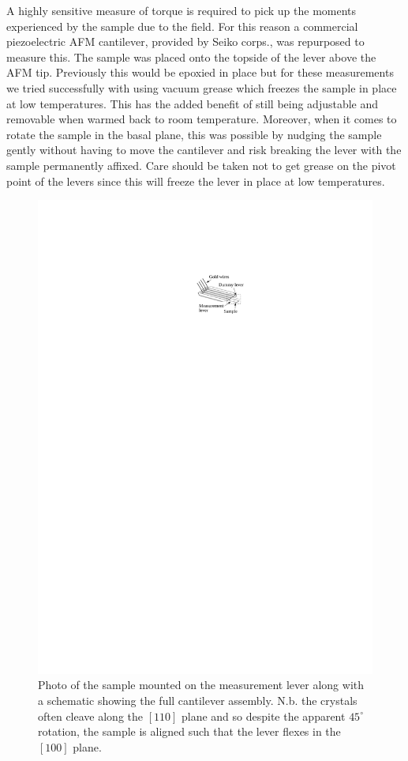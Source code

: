 A highly sensitive measure of torque is required to pick up the moments experienced by the sample due to the field. For this reason a commercial piezoelectric \ac{AFM} cantilever, provided by Seiko corps., was repurposed to measure this. The sample was placed onto the topside of the lever above the \ac{AFM} tip. Previously this would be epoxied in place but for these measurements we tried successfully with using vacuum grease which freezes the sample in place at low temperatures. This has the added benefit of still being adjustable and removable when warmed back to room temperature. Moreover, when it comes to rotate the sample in the basal plane, this was possible by nudging the sample gently without having to move the cantilever and risk breaking the lever with the sample permanently affixed. Care should be taken not to get grease on the pivot point of the levers since this will freeze the lever in place at low temperatures.
\begin{figure}[htbp]
    \begin{center}
        \includegraphics[scale=1.1]{Chapter-ExperimentalTechnique/Figures/CantileverSchematic/CantileverSchematic}
        \caption{Photo of the \BaFeP sample mounted on the measurement lever along with a schematic showing the full cantilever assembly. N.b. the \BaFeP crystals often cleave along the $[110]$ plane and so despite the apparent $45^\circ$ rotation, the sample is aligned such that the lever flexes in the $[100]$ plane.}
        \label{Fig:Exp:CantileverSchematic}
    \end{center}
\end{figure}
